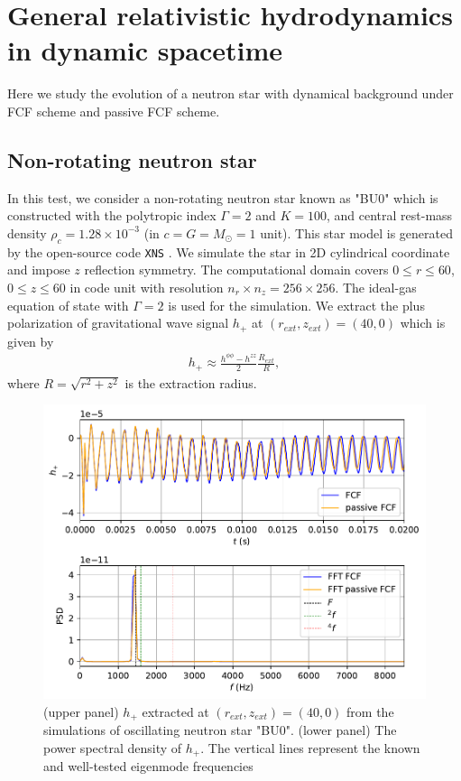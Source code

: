 \section{General relativistic hydrodynamics in dynamic spacetime} %
\label{section4.3}
Here we study the evolution of a neutron star with dynamical background under FCF scheme and passive FCF scheme.
\subsection{Non-rotating neutron star}
\label{section4.3.1}
In this test, we consider a non-rotating neutron star known as "BU0" \cite{dimmelmeier2006non}
which is constructed with the polytropic index $\Gamma = 2$ and $K = 100$,
and central rest-mass density $\rho_c = 1.28 \times 10^{-3}$ (in $c=G=M_\odot=1$ unit).
This star model is generated by the open-source code \texttt{XNS} 
\cite{bucciantini2011general,pili2014axisymmetric,pili2015general,pili2017general}.
We simulate the star in 2D cylindrical coordinate and impose $z$ reflection symmetry.
The computational domain covers $0 \leq r \leq 60$, $0\leq z \leq 60$ in code unit
with resolution $n_r \times n_z = 256 \times 256$.
The ideal-gas equation of state with $\Gamma = 2$ is used for the simulation.
We extract the plus polarization of gravitational wave signal $h_{+}$ at $(r_{ext}, z_{ext}) = (40, 0)$ which is given by
\begin{align}
    h_{+} \approx \frac{h^{\phi\phi} - h^{zz}}{2} \frac{R_{ext}}{R},
\end{align}
where $R=\sqrt{r^2+z^2}$ is the extraction radius.\\
\begin{figure}[h!]
\centering
  \includegraphics[width=\linewidth]{GW_combine_h_BU0.pdf}
\caption{(upper panel) $h_{+}$ extracted at $(r_{ext}, z_{ext}) = (40, 0)$ from the simulations of oscillating neutron star "BU0".
(lower panel) The power spectral density of $h_{+}$.
The vertical lines represent the known and well-tested eigenmode frequencies \cite{dimmelmeier2006non}}
\label{fig:GW_h_BU0}
\end{figure}
